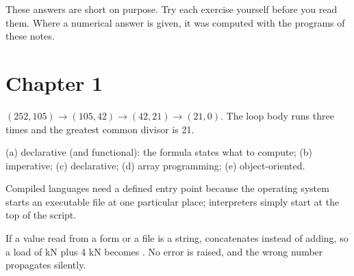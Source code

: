 
These answers are short on purpose. Try each exercise yourself before you read them. Where
a numerical answer is given, it was computed with the programs of these notes.

\section*{Chapter 1}
\begin{description}[style=nextline,leftmargin=0pt,font=\normalfont]
\item[\AnswerRef{1.1}] $(252, 105) \to (105, 42) \to (42, 21) \to (21, 0)$. The loop body runs three
  times and the greatest common divisor is 21.
\item[\AnswerRef{1.2}] (a) declarative (and functional): the formula states what to compute; (b)
  imperative; (c) declarative; (d) array programming; (e) object-oriented.
\item[\AnswerRef{1.4}] Compiled languages need a defined entry point because the operating system starts
  an executable file at one particular place; interpreters simply start at the top of the
  script.
\item[\AnswerRef{1.6}] If a value read from a form or a file is a string, \code{+} concatenates instead
  of adding, so a load of  kN plus 4 kN becomes . No error is raised,
  and the wrong number propagates silently.
\end{description}

